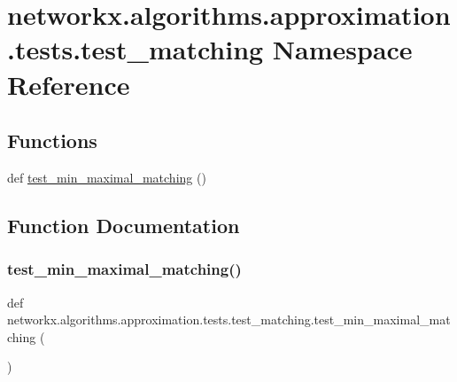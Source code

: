 \hypertarget{namespacenetworkx_1_1algorithms_1_1approximation_1_1tests_1_1test__matching}{}\section{networkx.\+algorithms.\+approximation.\+tests.\+test\+\_\+matching Namespace Reference}
\label{namespacenetworkx_1_1algorithms_1_1approximation_1_1tests_1_1test__matching}
\subsection*{Functions}
\begin{DoxyCompactItemize}
\item 
def \hyperlink{namespacenetworkx_1_1algorithms_1_1approximation_1_1tests_1_1test__matching_a419bb3039dae888501c26e002b41d87b}{test\+\_\+min\+\_\+maximal\+\_\+matching} ()
\end{DoxyCompactItemize}


\subsection{Function Documentation}
\mbox{\label{namespacenetworkx_1_1algorithms_1_1approximation_1_1tests_1_1test__matching_a419bb3039dae888501c26e002b41d87b}} 
\subsubsection{\texorpdfstring{test\+\_\+min\+\_\+maximal\+\_\+matching()}{test\_min\_maximal\_matching()}}
{\footnotesize\ttfamily def networkx.\+algorithms.\+approximation.\+tests.\+test\+\_\+matching.\+test\+\_\+min\+\_\+maximal\+\_\+matching (\begin{DoxyParamCaption}{ }\end{DoxyParamCaption})}

